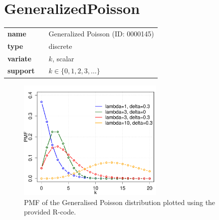 %
\smallskip\section*{GeneralizedPoisson} 

  \bigskip 

\begin{tabular}{p{2cm}cl}
\textbf{name} & & Generalized Poisson (ID: 0000145)\\ 
 
\textbf{type} & & discrete \\ 

\textbf{variate} & & $k
$, scalar \\ 

\textbf{support} & & $k \in \{0,1,2,3,\dots\}$
\end{tabular}

\begin{figure}[ht!]
\centering
  \includegraphics[width=70mm]{pics/GeneralisedPoisson_pmf_cdf.pdf}
 \caption{PMF of the Generalised Poisson distribution plotted using the provided R-code.}
 \label{fig:GeneralisedPoisson_pmf_cdf}
\end{figure}

